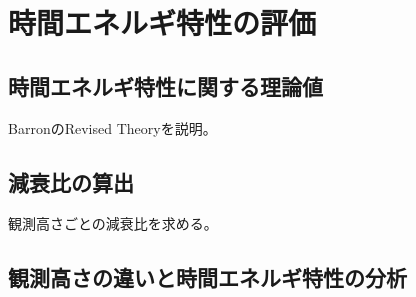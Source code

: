 \chapter{時間エネルギ特性の評価}
\section{時間エネルギ特性に関する理論値}
BarronのRevised Theoryを説明。
\section{減衰比の算出}
観測高さごとの減衰比を求める。
\section{観測高さの違いと時間エネルギ特性の分析}

